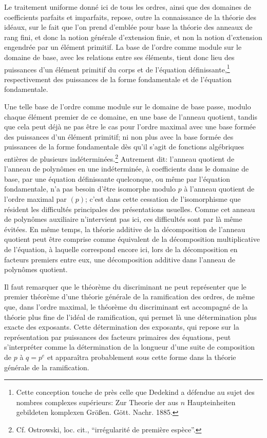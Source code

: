 Le traitement uniforme donné ici de tous les ordres, ainsi que des domaines de coefficients parfaits et imparfaits, repose, outre la connaissance de la théorie des idéaux, sur le fait que l'on prend d'emblée pour base la théorie des anneaux de rang fini, et donc la notion générale d'extension finie, et non la notion d'extension engendrée par un élément primitif. La base de l'ordre comme module sur le domaine de base, avec les relations entre ses éléments, tient donc lieu des puissances d'un élément primitif du corps et de l'équation définissante,\footnote{Cette conception touche de près celle que Dedekind a défendue au sujet des nombres complexes supérieurs: Zur Theorie der aus $n$ Haupteinheiten gebildeten komplexen Größen. Gött. Nachr. 1885.} respectivement des puissances de la forme fondamentale et de l'équation fondamentale.

Une telle base de l'ordre comme module sur le domaine de base passe, modulo chaque élément premier de ce domaine, en une base de l'anneau quotient, tandis que cela peut déjà ne pas être le cas pour l'ordre maximal avec une base formée des puissances d'un élément primitif; ni non plus avec la base formée des puissances de la forme fondamentale dès qu'il s'agit de fonctions algébriques entières de plusieurs indéterminées.\footnote{Cf. Ostrowski, loc. cit., ``irrégularité de première espèce''.} Autrement dit: l'anneau quotient de l'anneau de polynômes en une indéterminée, à coefficients dans le domaine de base, par une équation définissante quelconque, ou même par l'équation fondamentale, n'a pas besoin d'être isomorphe modulo $p$ à l'anneau quotient de l'ordre maximal par $(p)$; c'est dans cette cessation de l'isomorphisme que résident les difficultés principales des présentations usuelles. Comme cet anneau de polynômes auxiliaire n'intervient pas ici, ces difficultés sont par là même évitées. En même temps, la théorie additive de la décomposition de l'anneau quotient peut être comprise comme équivalent de la décomposition multiplicative de l'équation, à laquelle correspond encore ici, lors de la décomposition en facteurs premiers entre eux, une décomposition additive dans l'anneau de polynômes quotient.

Il faut remarquer que le théorème du discriminant ne peut représenter que le premier théorème d'une théorie générale de la ramification des ordres, de même que, dans l'ordre maximal, le théorème du discriminant est accompagné de la théorie plus fine de l'idéal de ramification, qui permet là une détermination plus exacte des exposants. Cette détermination des exposants, qui repose sur la représentation par puissances des facteurs primaires des équations, peut s'interpréter comme la détermination de la longueur d'une suite de composition de $p$ à $q=p^e$ et apparaîtra probablement sous cette forme dans la théorie générale de la ramification.

